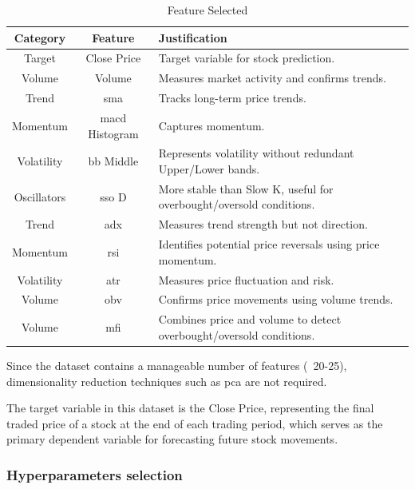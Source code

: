 \begin{table}[H]
    \centering
    \caption{Feature Selected}
    \label{tab:feature_selection_kept}
    \begin{tabular}{ccp{8cm}}
        \hline
        \textbf{Category} & \textbf{Feature} & \textbf{Justification} \\
        \hline\hline
        Target & Close Price & Target variable for stock prediction. \\
        Volume & Volume & Measures market activity and confirms trends. \\
        Trend  & \acrshort{sma} & Tracks long-term price trends.\\
        Momentum & \acrshort{macd} Histogram & Captures momentum. \\
        Volatility & \acrshort{bb} Middle & Represents volatility without 
        redundant Upper/Lower bands. \\
        Oscillators & \acrshort{sso} D & More stable than Slow K, useful for 
        overbought/oversold conditions. \\
        Trend & \acrshort{adx} & Measures trend strength but not direction. \\
        Momentum & \acrshort{rsi} & Identifies potential price reversals
        using price momentum. \\
        Volatility & \acrshort{atr} & Measures price fluctuation and risk. \\
        Volume & \acrshort{obv} & Confirms price movements using volume 
        trends. \\
        Volume & \acrshort{mfi} & Combines price and volume to detect
        overbought/oversold conditions. \\
        \hline
    \end{tabular}
\end{table}

Since the dataset contains a manageable number of features (~20-25),
dimensionality reduction techniques such as \acrfull{pca}
are not required. 

The target variable in this dataset is the Close Price, representing the final
traded price of a stock at the end of each trading period, which serves as the
primary dependent variable for forecasting future stock movements.


\subsubsection{Hyperparameters selection}

